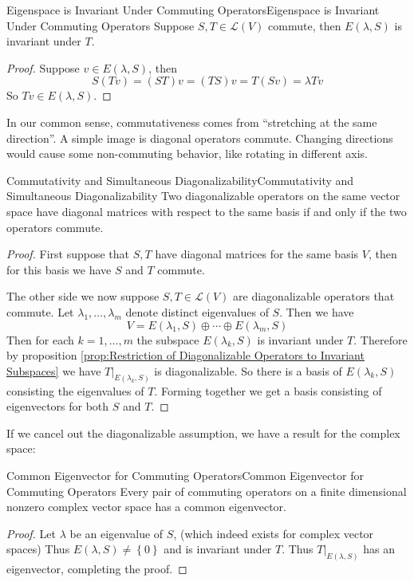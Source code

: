 \documentclass[../main.tex]{subfiles}
\begin{document}
\begin{theorem}{Eigenspace is Invariant Under Commuting Operators}{Eigenspace is Invariant Under Commuting Operators}
Suppose $S,T\in \mathscr{L}(V)$ commute, then $E(\lambda,S)$ is invariant under $T$.
\end{theorem}
\begin{proof}
Suppose $v\in E(\lambda,S)$, then
\begin{equation*}
S(Tv) = (ST)v = (TS)v = T(Sv) = \lambda Tv
\end{equation*}
So $Tv\in E(\lambda,S)$.
\end{proof}
\begin{remark}
In our common sense, commutativeness comes from ``stretching at the same direction''. A simple image is diagonal operators commute. Changing directions would cause some non-commuting behavior, like rotating in different axis.
\end{remark}

\begin{theorem}{Commutativity and Simultaneous Diagonalizability}{Commutativity and Simultaneous Diagonalizability}
Two diagonalizable operators on the same vector space have diagonal matrices with respect to the same basis if and only if the two operators commute.
\end{theorem}
\begin{proof}
First suppose that $S,T$ have diagonal matrices for the same basis $V$, then for this basis we have $S$ and $T$ commute.

The other side we now suppose $S,T\in \mathscr{L}(V)$ are diagonalizable operators that commute. Let $\lambda_1, \ldots ,\lambda_m$ denote distinct eigenvalues of $S$. Then we have
\begin{equation*}
V = E(\lambda_1, S) \oplus \cdots \oplus E(\lambda_m,S)
\end{equation*}
Then for each $k=1, \ldots ,m$ the subspace $E(\lambda_k,S)$ is invariant under $T$. Therefore by proposition \ref{prop:Restriction of Diagonalizable Operators to Invariant Subspaces} we have $T|_{E(\lambda_k,S)}$ is diagonalizable. So there is a basis of $E(\lambda_k,S)$ consisting the eigenvalues of $T$. Forming together we get a basis consisting of eigenvectors for both $S$ and $T$.
\end{proof}

If we cancel out the diagonalizable assumption, we have a result for the complex space:
\begin{proposition}{Common Eigenvector for Commuting Operators}{Common Eigenvector for Commuting Operators}
Every pair of commuting operators on a finite dimensional nonzero complex vector space has a common eigenvector.
\end{proposition}
\begin{proof}
Let $\lambda$ be an eigenvalue of $S$, (which indeed exists for complex vector spaces) Thus $E(\lambda,S)\neq \left\{ 0 \right\}$ and is invariant under $T$. Thus $T|_{E(\lambda,S)}$ has an eigenvector, completing the proof.
\end{proof}
\end{document}
